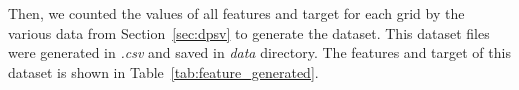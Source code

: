 \documentclass[final-report]{report-template}
\begin{document}
Then, we counted the values of all features and target for each grid by the various data from Section~\ref{sec:dpsv} to generate the dataset.
This dataset files were generated in \textit{.csv} and saved in \textit{data} directory.
The features and target of this dataset is shown in Table~\ref{tab:feature_generated}.
\end{document}
